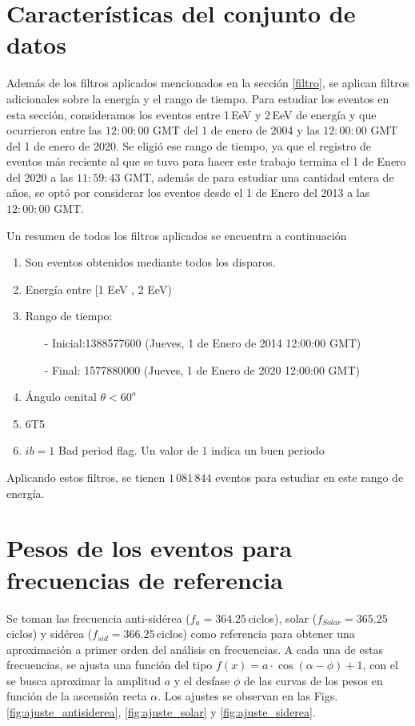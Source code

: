 	\section{Características del conjunto de datos} \label{specs}
	

	Además de los filtros aplicados mencionados en la sección \ref{filtro}, se aplican filtros adicionales sobre la energía y el rango de tiempo. Para estudiar los eventos en esta sección, consideramos los eventos entre 1\,EeV y 2\,EeV de energía y que ocurrieron entre las $12:00:00$ GMT del 1 de enero de 2004 y las $12:00:00$ GMT del 1 de enero de 2020. Se  eligió ese rango de tiempo, ya que el registro de eventos más reciente al que se tuvo para hacer este trabajo termina el 1 de Enero del 2020   a las $11:59:43$ GMT, además de para estudiar una cantidad entera de años, se optó por considerar los eventos desde el 1 de Enero del 2013 a las $12:00:00 $ GMT.

	Un resumen de todos los filtros aplicados se encuentra a continuación
		\begin{enumerate}
			\item Son eventos obtenidos mediante todos los disparos.
			\item Energía entre  [1 EeV , 2 EeV)
			\item Rango de tiempo:
			\begin{itemize}
				\item[-] Inicial:1388577600 (Jueves, 1 de Enero de 2014 12:00:00 GMT)
				\item[-] Final: 1577880000  (Jueves, 1 de Enero de 2020 12:00:00 GMT)
			\end{itemize}
			\item Ángulo cenital $\theta < 60^o$
			\item 6T5
			\item $ib=1$ Bad period flag. Un valor de 1 indica un buen periodo
		\end{enumerate}
	Aplicando estos filtros, se tienen $1\,081\,844$ eventos para estudiar en este rango de energía.


\section{Pesos de los eventos para frecuencias de referencia}

Se toman las frecuencia anti-sidérea ($f_a=364.25\,$ciclos), solar ($f_{Solar}= 365.25\,$ciclos) y sidérea ($f_{sid}= 366.25\,$ciclos) como referencia para obtener una aproximación a primer orden del análisis en frecuencias. A cada una de estas frecuencias, se ajusta una función del tipo  $f(x)=a\cdot \cos{(\alpha-\phi)} + 1$, con el se busca aproximar la amplitud $a$ y el desfase $\phi$ de las curvas de los pesos en función de la ascensión recta $\alpha$. Los ajustes se observan en las Figs. \ref{fig:ajuste_antisiderea}, \ref{fig:ajuste_solar} y \ref{fig:ajuste_siderea}.


